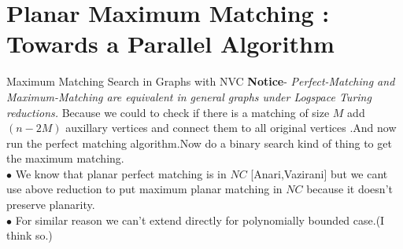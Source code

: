 \documentclass{beamer}
\begin{document}
\section{Planar Maximum Matching : Towards a Parallel Algorithm}
\begin{frame}[allowframebreaks]{Maximum Matching Search in Graphs with NVC}
	\textbf{Notice}- \textit{Perfect-Matching and Maximum-Matching are equivalent in general graphs under Logspace Turing reductions.}
	Because we could to check if there is a matching of size $M$ add $(n-2M)$ auxillary vertices and connect them to all original vertices .And now run the perfect matching algorithm.Now do a binary search kind of thing to get the maximum matching.\\
	$\bullet$ We know that planar perfect matching is in $NC$ [Anari,Vazirani] but we cant use above reduction to put maximum planar matching in $NC$ because it doesn't preserve planarity.\\
	$\bullet$ For similar reason we can't extend directly for polynomially bounded case.(I think so.)
	

\end{frame}
\end{document}
